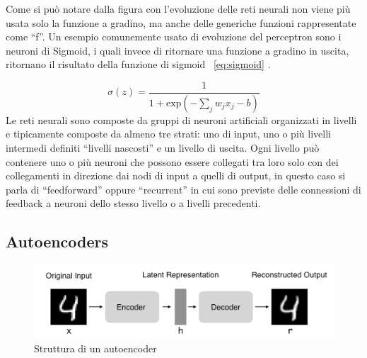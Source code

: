 Come si può notare dalla figura con l'evoluzione delle reti neurali non viene più usata solo la funzione a gradino, ma anche delle generiche funzioni rappresentate come ``f''.
Un esempio comunemente usato di evoluzione del perceptron sono i neuroni di Sigmoid, i quali invece di ritornare una funzione a gradino in uscita, ritornano il risultato della funzione di sigmoid ~\ref{eq:sigmoid} \cite{reti_neurali_libro}.

\begin{equation}
    \label{eq:sigmoid}
    \sigma(z) = \frac{1}{1+\mbox{exp}(-\sum_{j}{w_{j}x_{j}} - b)}
\end{equation}
Le reti neurali sono composte da gruppi di neuroni artificiali organizzati in livelli e tipicamente composte da almeno tre strati: uno di input, uno o più livelli intermedi definiti ``livelli nascosti'' e un livello di uscita. Ogni livello può contenere uno o più neuroni che possono essere collegati tra loro solo con dei collegamenti in direzione dai nodi di input a quelli di output, in questo caso si parla di ``feedforward'' oppure ``recurrent'' in cui sono previste delle connessioni di feedback a neuroni dello stesso livello o a livelli precedenti.
% 


\subsection{Autoencoders}
\begin{figure}[h]
    \includegraphics[width=\hsize]{images/reti_neurali/autoencoder.png}
    \caption{Struttura di un autoencoder}
    \label{fig:autoencoder}
    \centering
\end{figure}

